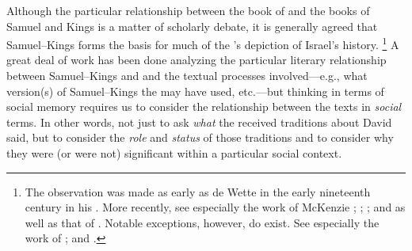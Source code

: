 Although the particular relationship between the book of \chronicles and the books of Samuel and Kings is a matter of scholarly debate, it is generally agreed that Samuel--Kings forms the basis for much of the \chronicler's depiction of Israel's history.%
    \footnote{The observation was made as early as de Wette in the early nineteenth century in his \cite*{dewette1806}. More recently, see especially the work of McKenzie
        \cite*{mckenzie1985};
        \cite{mckenzie_graham-mckenzie1999};
        \cite[66--71]{knoppers2003}; and 
        \cite[30--42]{klein2006} as well as that of 
        \cite[74--74]{carr2011}. Notable exceptions, however, do exist. See especially the work of 
        \cite{auld1994}; 
        \cite{auld_graham-mckenzie1999} and 
        \cite{person2010}.}
A great deal of work has been done analyzing the particular literary relationship between Samuel--Kings and \chronicles and the textual processes involved---e.g., what version(s) of Samuel--Kings the \chronicler may have used, etc.---but thinking in terms of social memory requires us to consider the relationship between the texts in \emph{social} terms. In other words, not just to ask \emph{what} the received traditions about David said, but to consider the \emph{role} and \emph{status} of those traditions and to consider why they were (or were not) significant within a particular social context.

